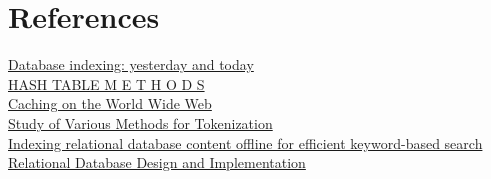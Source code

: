 \documentclass[10pt,a4paper]{article}
\begin{document}
\section*{References}
\href{https://citeseerx.ist.psu.edu/pdf/24ad3ea19602f0737807cb05fafe44c6c2f86aaf}{Database indexing: yesterday and today}\\
\href{https://dl.acm.org/doi/pdf/10.1145/356643.356645}{HASH TABLE M E T H O D S}\\
\href{https://ieeexplore.ieee.org/abstract/document/755618?casa_token=1dPMFNh1uOMAAAAA:EhTd5TzTa1RHsWQThUec5nDGgAe82xXTYaG32s8GsTNty9qoUoSPlu0Rzh-it8kQ-qtl19_LX-0KjA}{Caching on the World Wide Web}\\
\href{https://link.springer.com/chapter/10.1007/978-981-15-6198-6_18}{Study of Various Methods for Tokenization}\\
\href{https://ieeexplore.ieee.org/abstract/document/1540920?casa_token=hzg5FRuCiVQAAAAA:MDNu1j1gc-DR7xTkOo22jTVIlq55BcYoatyx97bKzY3HdvAw_7-4sRhCNF-iXQcbZQTw2Bb3u0YQxg}{Indexing relational database content offline for efficient keyword-based search}
\href{https://books.google.sk/books?hl=en&lr=&id=yQgfCgAAQBAJ&oi=fnd&pg=PP1&dq=relational+database&ots=qPKwl0TFYt&sig=6jOwNojMeS_JzJYt9NTVB7_gJwk&redir_esc=y#v=onepage&q=relational%20database&f=false}{Relational Database Design and Implementation}



%
\end{document}
